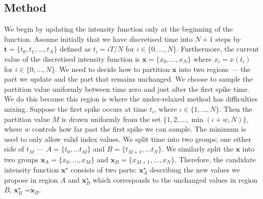 \documentclass[oneside, 12 pt]{book}
\begin{document}
\subsection{Method}
We begin by updating the intensity function only at the beginning of the function. Assume initially that we have discretised time into $N+1$ steps by $\mathbf{t} = \{t_0, t_1, \dots, t_N\}$ defined as $t_i = iT/N$ for $i \in \{0, \dots, N\}$. Furthermore, the current value of the discretised intensity function is $\mathbf{x} = \{x_0, \dots, x_N\}$ where $x_i =x(t_i)$ for $i \in \{0, \dots, N\}$. We need to decide how to partition $\mathbf{x}$ into two regions --- the part we update and the part that remains unchanged. We choose to sample the partition value uniformly between time zero and just after the first spike time. We do this because this region is where the under-relaxed method has difficulties mixing. Suppose the first spike occurs at time $t_\iota$, where $\iota \in \{1,\dots, N\}$. Then the partition value $M$ is drawn uniformly from the set $\{1,2, \dots, \min(\iota + w,N) \}$, where $w$ controls how far past the first spike we can sample. The minimum is used to only allow valid index values. We split time into two groups; one either side of $t_{M}$ --- $A = \{t_0, \dots t_{M}\}$ and $B = \{t_{M +1}, \dots t_N\}$. We similarly split the $\mathbf{x}$ into two groups $\mathbf{x}_A = \{x_0, \dots, x_{M}\}$ and $\mathbf{x}_B = \{x_{M +1}, \dots, x_{N}\}$. Therefore, the candidate intensity function $\mathbf{x}^\star$ consists of two parts: $\mathbf{x}^\star_A$  describing the new values we propose in region $A$ and $\mathbf{x}^\star_B$ which corresponds to the unchanged values in region $B$, $\mathbf{x}^\star_B$ =$\mathbf{x}_B$.
\end{document}
